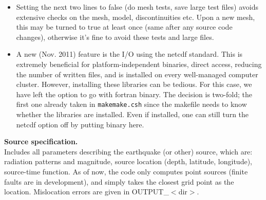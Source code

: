 \documentclass[11pt,letter,fleqn,english,notitlepage]{article}
\begin{document}
\begin{itemize}
    \item Setting the next two lines to false (do mesh tests, save large test
    files) avoids extensive checks on the mesh, model, discontinuities etc.
    Upon a new mesh, this may be turned to true at least once (same after any
    source code changes), otherwise it's fine to avoid these tests and large
    files.
    
    \item A new (Nov. 2011) feature is the I/O using the netcdf standard. This
    is extremely beneficial for platform-independent binaries, direct access,
    reducing the number of written files, and is installed on every
    well-managed computer cluster. However, installing these libraries can be
    tedious. For this case, we have left the option to go with fortran binary.
    The decision is two-fold; the first one already taken in {\tt makemake.csh}
    since the makefile needs to know whether the libraries are installed. Even
    if installed, one can still turn the netcdf option off by putting binary
    here. 
\end{itemize}

\noindent \textbf{Source specification.}\\
Includes all parameters describing the earthquake (or other) source, which are:
radiation patterns and magnitude, source location (depth, latitude, longitude),
source-time function.  As of now, the code only computes point sources (finite
faults are in development), and simply takes the closest grid point as the
location. Mislocation errors are given in OUTPUT\_$<$dir$>$.\\

\lstset{frame=single,basicstyle=\footnotesize, breaklines=true }

\end{document}
